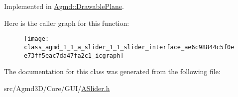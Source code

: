 Implemented in \hyperlink{class_agmd_1_1_drawable_plane_a4014f7ff890cfc0940755f3628170060}{Agmd\+::\+Drawable\+Plane}.



Here is the caller graph for this function\+:\nopagebreak
\begin{figure}[H]
\begin{center}
\leavevmode
\texttt{[image: class\_agmd\_1\_1\_a\_slider\_1\_1\_slider\_interface\_ae6c98844c5f0ee73ff5eac7da47fa2c1\_icgraph]}
\end{center}
\end{figure}




The documentation for this class was generated from the following file\+:\begin{DoxyCompactItemize}
\item 
src/\+Agmd3\+D/\+Core/\+G\+U\+I/\hyperlink{_a_slider_8h}{A\+Slider.\+h}\end{DoxyCompactItemize}
